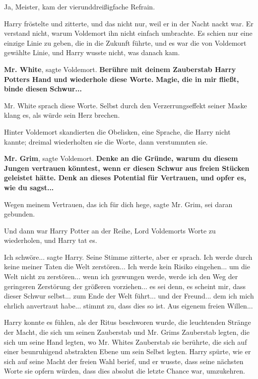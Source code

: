 \glqq{}Ja, Meister\grqq{}, kam der vierunddreißigfache Refrain.

Harry fröstelte und zitterte, und das nicht nur, weil er in der Nacht nackt war.
Er verstand nicht, warum Voldemort ihn nicht einfach umbrachte. Es schien nur
eine einzige Linie zu geben, die in die Zukunft führte, und es war die von
Voldemort gewählte Linie, und Harry wusste nicht, was danach kam.

\glqq{}\textbf{Mr. White}\grqq{}, sagte Voldemort. \glqq{}\textbf{Berühre mit
deinem Zauberstab Harry Potters Hand und wiederhole diese Worte.} \textbf{Magie,
die in mir fließt, binde diesen} \textbf{Schwur...}\grqq{}

Mr. White sprach diese Worte. Selbst durch den Verzerrungseffekt seiner Maske
klang es, als würde sein Herz brechen.

Hinter Voldemort skandierten die Obelisken, eine Sprache, die Harry nicht
kannte; dreimal wiederholten sie die Worte, dann verstummten sie.

\glqq{}\textbf{Mr. Grim}\grqq{}, sagte Voldemort. \glqq{}\textbf{Denke an die
Gründe, warum du diesem Jungen vertrauen könntest, wenn er diesen Schwur aus
freien Stücken geleistet hätte. Denk an dieses Potential für Vertrauen, und
opfer es, wie du sagst...}\grqq{}

\glqq{}Wegen meinem Vertrauen, das ich für dich hege\grqq{}, sagte Mr. Grim,
\glqq{}sei daran gebunden.\grqq{}

Und dann war Harry Potter an der Reihe, Lord Voldemorts Worte zu wiederholen,
und Harry tat es.

\glqq{}Ich schwöre...\grqq{} sagte Harry. Seine Stimme zitterte, aber er sprach.
\glqq{}Ich werde durch keine meiner Taten die Welt zerstören... Ich werde kein
Risiko eingehen... um die Welt nicht zu zerstören... wenn ich gezwungen werde,
werde ich den Weg der geringeren Zerstörung der größeren vorziehen... es sei
denn, es scheint mir, dass dieser Schwur selbst... zum Ende der Welt führt...
und der Freund... dem ich mich ehrlich anvertraut habe... stimmt zu, dass dies
so ist. Aus eigenem freien Willen...\grqq{}

Harry konnte es fühlen, als der Ritus beschworen wurde, die leuchtenden Stränge
der Macht, die sich um seinen Zauberstab und Mr. Grims Zauberstab legten, die
sich um seine Hand legten, wo Mr. Whites Zauberstab sie berührte, die sich auf
einer beunruhigend abstrakten Ebene um sein Selbst legten. Harry spürte, wie er
sich auf seine Macht der freien Wahl berief, und er wusste, dass seine nächsten
Worte sie opfern würden, dass dies absolut die letzte Chance war, umzukehren.

